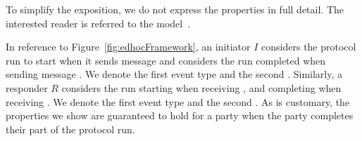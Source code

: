 {To simplify the exposition, we do not express the properties in full detail.
%
The interested reader is referred to the \mTamarin{}
model~\cite{edhocTamarinRepo}.
%

In reference to Figure~\ref{fig:edhocFramework}, an initiator $I$ considers the
protocol run to start when it sends message \mMsgone{} and considers the run
completed when sending message \mMsgthree{}.
%
We denote the first event type \mIStart{} and the second \mIComplete{}.
%
Similarly, a responder $R$ considers the run starting when receiving
\mMsgone{}, and completing when receiving \mMsgthree{}.
%
We denote the first event type \mRStart{} and the second \mRComplete{}.
%
As is customary, the properties we show are guaranteed to hold for a party when
the party completes their part of the protocol run.\\
%

}
